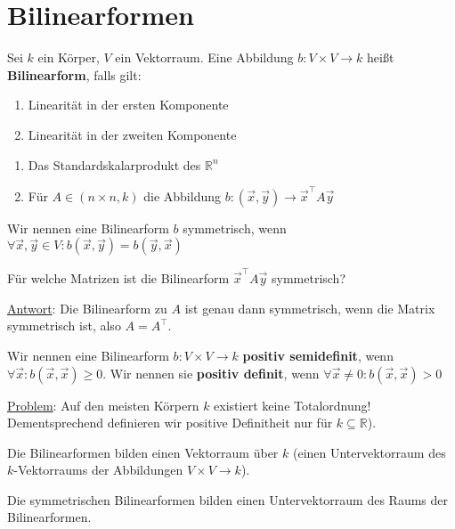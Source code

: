 \documentclass{report}
\newcommand{\tbf}[1]{\textbf{#1}}
\newcommand{\ul}[1]{\underline{#1}}
\newcommand{\bR}{\mathbb{R}}
\newcommand{\vx}{\vec{x}}
\newcommand{\vy}{\vec{y}}
\begin{document}
\section{Bilinearformen}
\begin{definition}
 Sei $k$ ein Körper, $V$ ein Vektorraum. Eine Abbildung $b : V \times V \to k$ heißt \tbf{Bilinearform}, falls gilt:
 \begin{enumerate}
  \item Linearität in der ersten Komponente
  \item Linearität in der zweiten Komponente
 \end{enumerate}
\end{definition}
\begin{beispiel}
\begin{enumerate}
 \item Das Standardskalarprodukt des $\bR^n$
 \item Für $A \in (n \times n, k)$ die Abbildung $b : (\vx, \vy) \to \vx^\top A \vy$
\end{enumerate}
\end{beispiel}
\begin{definition}
 Wir nennen eine Bilinearform $b$ symmetrisch, wenn $\forall \vx, \vy \in V : b(\vx, \vy) = b(\vy, \vx)$
\end{definition}
\begin{question}
 Für welche Matrizen ist die Bilinearform $\vx^\top A \vy$ symmetrisch?
\end{question}
\hspace{-14pt}\ul{Antwort}: Die Bilinearform zu $A$ ist genau dann symmetrisch, wenn die Matrix symmetrisch ist, also $A = A^\top$.
\begin{definition}
 Wir nennen eine Bilinearform $b : V \times V \to k$ \tbf{positiv semidefinit}, wenn $\forall \vx : b(\vx,\vx) \geq 0$. Wir nennen sie \tbf{positiv definit}, wenn $\forall \vx \neq 0 : b(\vx, \vx) > 0$
\end{definition}
\hspace{-14pt}\ul{Problem}: Auf den meisten Körpern $k$ existiert keine Totalordnung! Dementsprechend definieren wir positive Definitheit nur für $k \subseteq \bR$).
\begin{beobachtung}
 Die Bilinearformen bilden einen Vektorraum über $k$ (einen Untervektorraum des $k$-Vektorraums der Abbildungen $V \times V \to k$).
\end{beobachtung}
\begin{beobachtung}
 Die symmetrischen Bilinearformen bilden einen Untervektorraum des Raums der Bilinearformen.
\end{beobachtung}
\end{document}
